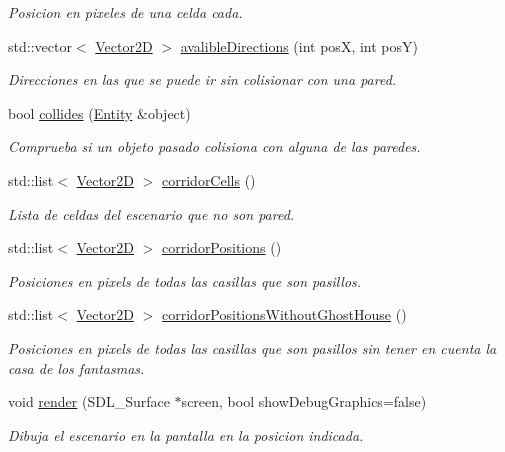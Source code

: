 \begin{DoxyCompactItemize}
\begin{DoxyCompactList}\small\item\em Posicion en pixeles de una celda cada. \end{DoxyCompactList}\item 
std\-::vector$<$ \hyperlink{class_vector2_d}{Vector2\-D} $>$ \hyperlink{class_scenario_a501950a0beb5aaeb0e31704818097ae4}{avalible\-Directions} (int pos\-X, int pos\-Y)
\begin{DoxyCompactList}\small\item\em Direcciones en las que se puede ir sin colisionar con una pared. \end{DoxyCompactList}\item 
bool \hyperlink{class_scenario_a4cad7d000c20baab4301e2561c82f514}{collides} (\hyperlink{class_entity}{Entity} \&object)
\begin{DoxyCompactList}\small\item\em Comprueba si un objeto pasado colisiona con alguna de las paredes. \end{DoxyCompactList}\item 
\hypertarget{class_scenario_a0789f28647f405ff79bde8a2cb03931c}{std\-::list$<$ \hyperlink{class_vector2_d}{Vector2\-D} $>$ \hyperlink{class_scenario_a0789f28647f405ff79bde8a2cb03931c}{corridor\-Cells} ()}\label{class_scenario_a0789f28647f405ff79bde8a2cb03931c}

\begin{DoxyCompactList}\small\item\em Lista de celdas del escenario que no son pared. \end{DoxyCompactList}\item 
std\-::list$<$ \hyperlink{class_vector2_d}{Vector2\-D} $>$ \hyperlink{class_scenario_af50bc8b0ac052db72a77a1d265078b6b}{corridor\-Positions} ()
\begin{DoxyCompactList}\small\item\em Posiciones en pixels de todas las casillas que son pasillos. \end{DoxyCompactList}\item 
std\-::list$<$ \hyperlink{class_vector2_d}{Vector2\-D} $>$ \hyperlink{class_scenario_abf51342b7ef5c8461b05085a085af2b2}{corridor\-Positions\-Without\-Ghost\-House} ()
\begin{DoxyCompactList}\small\item\em Posiciones en pixels de todas las casillas que son pasillos sin tener en cuenta la casa de los fantasmas. \end{DoxyCompactList}\item 
void \hyperlink{class_scenario_aa1479dc291201e8d2e3cbad06f87659b}{render} (S\-D\-L\-\_\-\-Surface $\ast$screen, bool show\-Debug\-Graphics=false)
\begin{DoxyCompactList}\small\item\em Dibuja el escenario en la pantalla en la posicion indicada. \end{DoxyCompactList}\end{DoxyCompactItemize}


